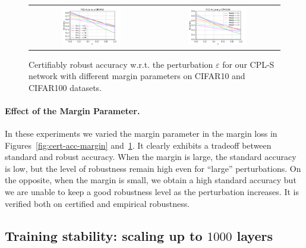 \begin{figure}[h]
    \centering
    \begin{tabular}{cc}
    \includegraphics[width=0.49\textwidth]{sections/4_certification/images/pgd_acc_margin_eps_c10.pdf}&\includegraphics[width=0.49\textwidth]{sections/4_certification/images/pgd_acc_margin_eps_c100.pdf}
    \end{tabular}
    \caption{Certifiably robust accuracy w.r.t. the perturbation $\varepsilon$ for our CPL-S  network with different margin parameters on CIFAR10 and CIFAR100 datasets.}
    \label{fig:pgd-acc-margin}
\end{figure}

\paragraph{Effect of the Margin Parameter.}
In these experiments we varied the margin parameter in the margin loss in Figures~\ref{fig:cert-acc-margin} and~\ref{fig:pgd-acc-margin}. It clearly exhibits a tradeoff between standard and robust accuracy. When the margin is large, the standard accuracy is low, but the level of robustness remain high even for ``large'' perturbations. On the opposite, when the margin is small, we obtain a high standard accuracy but we are unable to keep a good robustness level as the perturbation increases. It is verified both on certified and empirical robustness.





\subsection{Training stability: scaling up to $1000$ layers}

